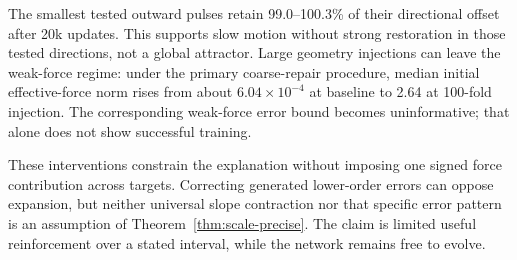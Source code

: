 The smallest tested outward pulses retain 99.0--100.3\% of their directional
offset after 20k updates. This supports slow motion without strong restoration
in those tested directions, not a global attractor. Large geometry injections
can leave the weak-force regime: under the primary coarse-repair procedure,
median initial effective-force norm rises from about $6.04\times10^{-4}$
at baseline to 2.64 at 100-fold injection. The corresponding weak-force
error bound becomes uninformative; that alone does not show successful
training.

These interventions constrain the explanation without imposing one signed
force contribution across targets. Correcting generated lower-order errors
can oppose expansion, but neither universal slope contraction nor that
specific error pattern is an assumption of Theorem~\ref{thm:scale-precise}.
The claim is limited useful reinforcement over a stated interval, while
the network remains free to evolve.
